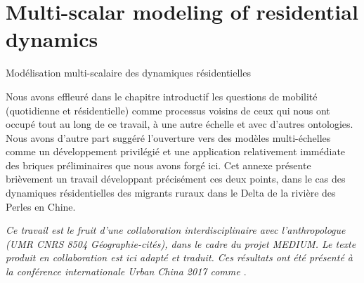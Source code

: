 

\newpage

\section{Multi-scalar modeling of residential dynamics}{Modélisation multi-scalaire des dynamiques résidentielles} %

\label{app:sec:migrationdynamics} %



Nous avons effleuré dans le chapitre introductif les questions de mobilité (quotidienne et résidentielle) comme processus voisins de ceux qui nous ont occupé tout au long de ce travail, à une autre échelle et avec d'autres ontologies. Nous avons d'autre part suggéré l'ouverture vers des modèles multi-échelles comme un développement privilégié et une application relativement immédiate des briques préliminaires que nous avons forgé ici. Cet annexe présente brièvement un travail développant précisément ces deux points, dans le cas des dynamiques résidentielles des migrants ruraux dans le Delta de la rivière des Perles en Chine.


\stars




\textit{Ce travail est le fruit d'une collaboration interdisciplinaire avec l'anthropologue  (UMR CNRS 8504 Géographie-cités), dans le cadre du projet MEDIUM. Le texte produit en collaboration est ici adapté et traduit. Ces résultats ont été présenté à la conférence internationale Urban China 2017 comme \cite{losavio2017modeling}}.


\stars





